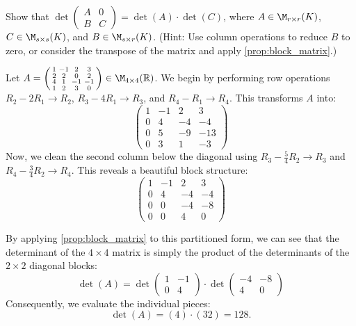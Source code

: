 \begin{remark}[Exercise]
  Show that $\det \left(\begin{smallmatrix} A & 0 \\ B & C \end{smallmatrix}\right) = \det(A) \cdot \det(C)$, where $A \in \M_{r \times r}(K)$, $C \in \M_{s \times s}(K)$, and $B \in \M_{s \times r}(K)$. (Hint: Use column operations to reduce $B$ to zero, or consider the transpose of the matrix and apply \cref{prop:block_matrix}.)
\end{remark}

\begin{example}
  Let $A = \left(\begin{smallmatrix} 1 & -1 & 2 & 3 \\ 2 & 2 & 0 & 2 \\ 4 & 1 & -1 & -1 \\ 1 & 2 & 3 & 0 \end{smallmatrix}\right) \in \M_{4 \times 4}(\mathbb{R})$.
  We begin by performing row operations $R_2 - 2R_1 \to R_2$, $R_3 - 4R_1 \to R_3$, and $R_4 - R_1 \to R_4$. This transforms $A$ into:
  \[
  \begin{pmatrix}
    1 & -1 & 2 & 3 \\
    0 & 4 & -4 & -4 \\
    0 & 5 & -9 & -13 \\
    0 & 3 & 1 & -3
  \end{pmatrix}
  \]
  Now, we clean the second column below the diagonal using $R_3 - \frac{5}{4}R_2 \to R_3$ and $R_4 - \frac{3}{4}R_2 \to R_4$. This reveals a beautiful block structure:
  \[
  \left(
  \begin{array}{cc|cc}
    1 & -1 & 2 & 3 \\
    0 & 4 & -4 & -4 \\ \hline
    0 & 0 & -4 & -8 \\
    0 & 0 & 4 & 0
  \end{array}
  \right)
  \]

  By applying \cref{prop:block_matrix} to this partitioned form, we can see that the determinant of the $4 \times 4$ matrix is simply the product of the determinants of the $2 \times 2$ diagonal blocks:
  \[
  \det(A) = \det \begin{pmatrix} 1 & -1 \\ 0 & 4 \end{pmatrix} \cdot \det \begin{pmatrix} -4 & -8 \\ 4 & 0 \end{pmatrix}
  \]
  Consequently, we evaluate the individual pieces:
  \[
  \det(A) = (4) \cdot (32) = 128.
  \]
\end{example}



